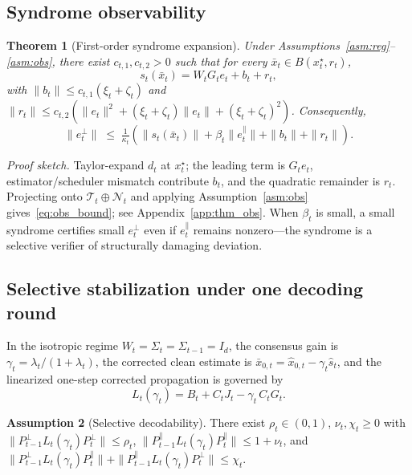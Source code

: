 \documentclass{article}
\theoremstyle{plain}
\newtheorem{theorem}{Theorem}[section]
\theoremstyle{definition}
\newtheorem{assumption}[theorem]{Assumption}
\theoremstyle{remark}
\begin{document}
\subsection{Syndrome observability}

\begin{theorem}[First-order syndrome expansion]\label{thm:observability}
Under Assumptions~\ref{asm:reg}--\ref{asm:obs}, there exist \(c_{t,1},c_{t,2}>0\)
such that for every \(\bar x_t \in B(x_t^\star,r_t)\),
\begin{equation}
s_t(\bar x_t) = W_t G_t e_t + b_t + r_t,
\label{eq:syn_expansion}
\end{equation}
with \(\|b_t\|\le c_{t,1}(\xi_t+\zeta_t)\) and
\(\|r_t\|\le c_{t,2}(\|e_t\|^2 + (\xi_t+\zeta_t)\|e_t\| + (\xi_t+\zeta_t)^2)\).
Consequently,
\begin{equation}
\|e_t^\perp\|
\;\le\;
\tfrac{1}{\kappa_t}\left(\|s_t(\bar x_t)\| + \beta_t\|e_t^\parallel\|
  + \|b_t\| + \|r_t\|\right).
\label{eq:obs_bound}
\end{equation}
\end{theorem}

\emph{Proof sketch.} Taylor-expand \(d_t\) at \(x_t^\star\); the leading
term is \(G_t e_t\), estimator/scheduler mismatch contribute \(b_t\), and
the quadratic remainder is \(r_t\). Projecting onto
\(\mathcal{T}_t\oplus\mathcal{N}_t\) and applying Assumption~\ref{asm:obs}
gives~\eqref{eq:obs_bound}; see Appendix~\ref{app:thm_obs}. When
\(\beta_t\) is small, a small syndrome certifies small \(e_t^\perp\) even if
\(e_t^\parallel\) remains nonzero---the syndrome is a selective verifier of
structurally damaging deviation.

\subsection{Selective stabilization under one decoding round}

In the isotropic regime \(W_t=\Sigma_t=\Sigma_{t-1}=I_d\), the consensus
gain is \(\gamma_t=\lambda_t/(1+\lambda_t)\), the corrected clean estimate
is \(\bar x_{0,t} = \hat x_{0,t} - \gamma_t\hat s_t\), and the linearized
one-step corrected propagation is governed by
\begin{equation}
L_t(\gamma_t) = B_t + C_t J_t - \gamma_t\, C_t G_t.
\label{eq:L_operator}
\end{equation}

\begin{assumption}[Selective decodability]\label{asm:decode}
There exist \(\rho_t\in(0,1)\), \(\nu_t,\chi_t\ge 0\) with
\(\|P_{t-1}^\perp L_t(\gamma_t) P_t^\perp\|\le \rho_t\),
\(\|P_{t-1}^\parallel L_t(\gamma_t) P_t^\parallel\|\le 1+\nu_t\), and
\(\|P_{t-1}^\perp L_t(\gamma_t) P_t^\parallel\|
 +\|P_{t-1}^\parallel L_t(\gamma_t) P_t^\perp\|\le \chi_t\).
\end{assumption}
\end{document}
